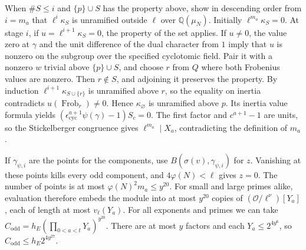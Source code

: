 When \(\#S\le i\) and \(\{p\}\cup S\) has the property above, show in descending order from \(i=m_a\)
that \(\ell^i\kappa_S\) is unramified outside \(\ell\) over \(\mathbb Q(\mu_N)\).
Initially \(\ell^{m_a}\kappa_S=0\). At stage \(i\), if \(u=\ell^{i+1}\kappa_S=0\), the property
of the set applies. If \(u\ne0\), the value zero at \(\gamma\) and the unit difference of the dual
character from \(1\) imply that \(u\) is nonzero on the subgroup over the specified cyclotomic
field. Pair it with a nonzero \(w\) trivial above \(\{p\}\cup S\), and choose \(r\) from \(Q\)
where both Frobenius values are nonzero. Then \(r\notin S\), and adjoining it preserves the property.
By induction \(\ell^{i+1}\kappa_{S\cup\{r\}}\) is unramified above \(r\), so the equality on inertia
contradicts \(u(\operatorname{Frob}_r)\ne0\). Hence \(\kappa_\varnothing\) is unramified above \(p\).
Its inertia value formula yields \((\epsilon_{\mathrm{cyc}}^{a+1}\psi(\gamma)-1)S_c=0\).
The first factor and \(c^{a+1}-1\) are units, so the Stickelberger congruence gives
\(\ell^{m_a}\mid X_a\), contradicting the definition of \(m_a\).

If \(\gamma_{\psi,i}\) are the points for the components, use \(B(\sigma(v),\gamma_{\psi,i})\)
for \(z\). Vanishing at these points kills every odd component, and \(4\varphi(N)<\ell\) gives
\(z=0\). The number of points is at most \(\varphi(N)^2m_a\le y^{20}\).
For small and large primes alike, evaluation therefore embeds the module into at most
\(y^{20}\) copies of \((\mathcal O/\ell^\nu)[Y_a]\), each of length at most \(v_\ell(Y_a)\).
For all exponents and primes we can take \(C_{\mathrm{odd}}=h_E(\prod_{0<a<t}Y_a)^{y^{20}}\).
There are at most \(y\) factors and each \(Y_a\le 2^{4y^6}\), so
\(C_{\mathrm{odd}}\le h_E2^{4y^{27}}\).
